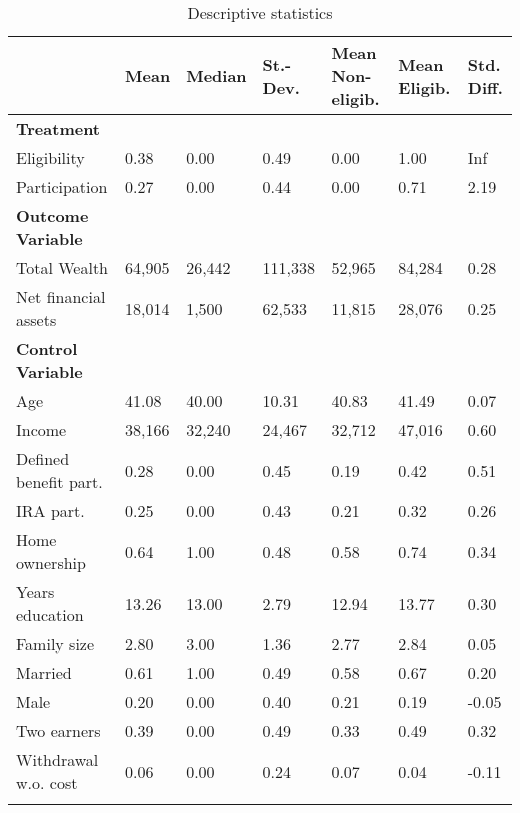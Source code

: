 \begin{scriptsize}
\begin{ThreePartTable}
				\begin{longtable}{l C{1.45cm} C{1.45cm} C{1.45cm} C{1.45cm}C{1.45cm} C{1.45cm}}
					\caption{Descriptive statistics}\label{tab_descriptives}\\
					\toprule
					 & Mean & Median & St.-Dev. & Mean Non-eligib. & Mean Eligib. & Std. Diff.\\ 
					\midrule
					\textbf{Treatment} & & & & & & \\
					Eligibility & 0.38 & 0.00 & 0.49 & 0.00 & 1.00 & Inf \\ 
  Participation & 0.27 & 0.00 & 0.44 & 0.00 & 0.71 & 2.19 \\ 
  					\midrule
					\textbf{Outcome Variable} & & & & & & \\
					 Total Wealth & 64,905 & 26,442 & 111,338 & 52,965 & 84,284 & 0.28 \\ 
  Net financial assets & 18,014 & 1,500 & 62,533 & 11,815 & 28,076 & 0.25 \\ 
					\midrule
					\textbf{Control Variable}  & & & & & & \\
				  Age & 41.08 & 40.00 & 10.31 & 40.83 & 41.49 & 0.07 \\ 
Income & 38,166 & 32,240 & 24,467 & 32,712 & 47,016 & 0.60 \\ 
  Defined benefit part. & 0.28 & 0.00 & 0.45 & 0.19 & 0.42 & 0.51 \\ 
   IRA part. & 0.25 & 0.00 & 0.43 & 0.21 & 0.32 & 0.26 \\ 
 Home ownership & 0.64 & 1.00 & 0.48 & 0.58 & 0.74 & 0.34 \\ 
  Years education & 13.26 & 13.00 & 2.79 & 12.94 & 13.77 & 0.30 \\ 
  Family size & 2.80 & 3.00 & 1.36 & 2.77 & 2.84 & 0.05 \\ 
  Married & 0.61 & 1.00 & 0.49 & 0.58 & 0.67 & 0.20 \\ 
  Male & 0.20 & 0.00 & 0.40 & 0.21 & 0.19 & -0.05 \\ 
  Two earners & 0.39 & 0.00 & 0.49 & 0.33 & 0.49 & 0.32 \\ 
   Withdrawal w.o. cost & 0.06 & 0.00 & 0.24 & 0.07 & 0.04 & -0.11 \\ 

				\bottomrule
				\insertTableNotes \\
				\end{longtable} 

				
			\end{ThreePartTable}
	\end{scriptsize}
